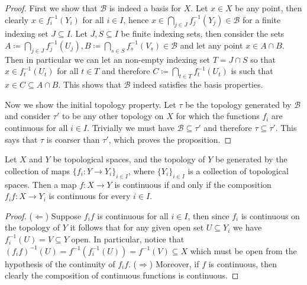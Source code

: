 \begin{proof}
    First we show that \(\mathcal B\) is indeed a basis for \(X\). Let \(x \in X\)
    be any point, then clearly \(x \in f_i^{-1}(Y_i)\) for all \(i \in I\), hence
    \(x \in \bigcap_{j \in  J} f_j^{-1}(Y_j) \in \mathcal B\) for a finite
    indexing set \(J \subseteq I\).
    Let \(J, S \subseteq I\) be finite indexing sets, then consider the sets
    \(A \coloneq \bigcap_{j \in J} f_j^{-1}(U_j), B \coloneq \bigcap_{s \in S} f_s^{-1}(V_s) \in
    \mathcal B\) and let any point \(x \in A \cap B\). Then in particular we can
    let an non-empty indexing set \(T = J \cap S\) so that \(x \in f_t^{-1}(U_t)\)
    for all \(t \in T\) and therefore \(C \coloneq \bigcap_{t \in  T} f_t^{-1}(U_t)\) is
    such that \(x \in C \subseteq A \cap B\). This shows that \(\mathcal B\)
    indeed satisfies the basis properties.

    Now we show the initial topology property. Let \(\tau\) be the topology
    generated by \(\mathcal B\) and consider \(\tau'\) to be any other
    topology on \(X\) for which the functions \(f_i\) are continuous for all \(i
    \in I\). Trivially we must have \(\mathcal B \subseteq \tau'\) and
    therefore \(\tau \subseteq \tau'\). This says that \(\tau\)
    is coarser than \(\tau'\), which proves the proposition.
\end{proof}

\begin{proposition}
    Let \(X\) and \(Y\) be topological spaces, and the topology of \(Y\) be
    generated by the collection of maps \(\{f_i : Y \to Y_i\}_{i \in I}\), where
    \(\{Y_i\}_{i \in I}\) is a collection of topological spaces. Then a map \(f :
    X \to Y\) is continuous if and only if the composition \(f_i f : X \to
    Y_i\) is continuous for every \(i \in I\).
\end{proposition}

\begin{proof}
    (\(\Leftarrow\)) Suppose \(f_i f\) is continuous for all \(i \in I\),
    then since \(f_i\) is continuous on the topology of \(Y\) it follows that for
    any given open set \(U \subseteq Y_i\) we have \(f_i^{-1}(U) = V \subseteq Y\)
    open. In particular, notice that \((f_i f)^{-1}(U) = f^{-1}(f_i^{-1}(U))
    = f^{-1}(V) \subseteq X\) which must be open from the hypothesis of the
    continuity of \(f_i f\). (\(\Rightarrow\)) Moreover, if \(f\) is
    continuous, then clearly the composition of continuous functions is
    continuous.
\end{proof}

